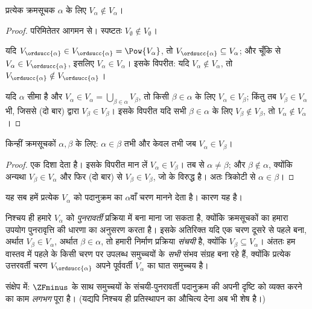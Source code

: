 \documentclass[../../../include/open-logic-section]{subfiles}
\begin{document}
\begin{lem}
प्रत्येक क्रमसूचक $\alpha$ के लिए $V_\alpha \notin V_\alpha$।
\end{lem}

\begin{proof}
परिमितेतर आगमन से। स्पष्टतः $V_\emptyset \notin V_\emptyset$।

यदि $V_{\ordsucc{\alpha}} \in V_{\ordsucc{\alpha}} = \Pow{V_\alpha}$,
तो $V_{\ordsucc{\alpha}} \subseteq V_\alpha$; और चूँकि
 से $V_\alpha \in V_{\ordsucc{\alpha}}$, इसलिए
$V_\alpha \in V_\alpha$। इसके विपरीत: यदि
$V_\alpha \notin V_\alpha$, तो
$V_{\ordsucc{\alpha}} \notin V_{\ordsucc{\alpha}}$।

यदि $\alpha$ सीमा है और
$V_\alpha \in V_\alpha = \bigcup_{\beta \in \alpha}V_\beta$, तो किसी
$\beta \in \alpha$ के लिए $V_\alpha \in V_\beta$; किंतु तब
$V_\beta \in V_\alpha$ भी, जिससे  (दो बार) द्वारा
$V_\beta \in V_\beta$। इसके विपरीत यदि सभी $\beta \in \alpha$ के लिए
$V_\beta \notin V_\beta$, तो $V_\alpha \notin V_\alpha$।
\end{proof}

\begin{cor}
किन्हीं क्रमसूचकों $\alpha, \beta$ के लिए: $\alpha \in \beta$ तभी और
केवल तभी जब $V_\alpha \in V_\beta$।
\end{cor}

\begin{proof}
 एक दिशा देता है। इसके विपरीत मान लें
$V_\alpha \in V_\beta$। तब  से
$\alpha \neq \beta$; और $\beta \notin \alpha$, क्योंकि अन्यथा
$V_\beta \in V_\alpha$ और फिर  (दो बार) से
$V_\beta \in V_\beta$, जो  के विरुद्ध है। अतः त्रिकोटी
से $\alpha \in \beta$।
\end{proof}
\noindent
यह सब हमें प्रत्येक $V_\alpha$ को पदानुक्रम का $\alpha$वाँ चरण मानने देता
है। कारण यह है।

निश्चय ही हमारे $V_\alpha$ को \emph{पुनरावर्ती} प्रक्रिया में बना माना जा
सकता है, क्योंकि क्रमसूचकों का हमारा उपयोग पुनरावृत्ति की धारणा का अनुसरण
करता है। इसके अतिरिक्त यदि एक चरण दूसरे से पहले बना, अर्थात
$V_\beta \in V_\alpha$, अर्थात $\beta \in \alpha$, तो हमारी निर्माण
प्रक्रिया \emph{संचयी} है, क्योंकि $V_\beta \subseteq V_\alpha$। अंततः हम
वास्तव में पहले के किसी चरण पर उपलब्ध समुच्चयों के \emph{सभी} संभव संग्रह
बना रहे हैं, क्योंकि प्रत्येक उत्तरवर्ती चरण $V_{\ordsucc{\alpha}}$ अपने
पूर्ववर्ती $V_\alpha$ का घात समुच्चय है।

संक्षेप में: $\ZFminus$ के साथ समुच्चयों के संचयी-पुनरावर्ती पदानुक्रम की
अपनी दृष्टि को व्यक्त करने का काम \emph{लगभग} पूरा है। (यद्यपि निश्चय ही
प्रतिस्थापन का औचित्य देना अब भी शेष है।)
\end{document}
